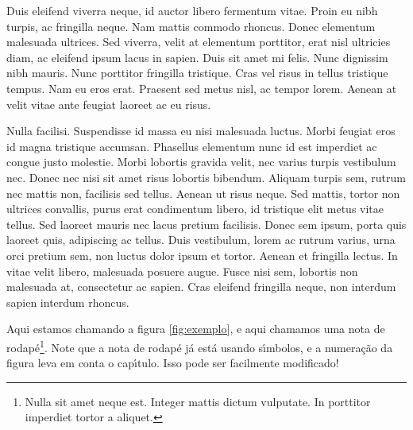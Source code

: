 Duis eleifend viverra neque, id auctor libero fermentum vitae. Proin eu nibh turpis, ac fringilla neque. Nam mattis commodo rhoncus. Donec elementum malesuada ultrices. Sed viverra, velit at elementum porttitor, erat nisl ultricies diam, ac eleifend ipsum lacus in sapien. Duis sit amet mi felis. Nunc dignissim nibh mauris. Nunc porttitor fringilla tristique. Cras vel risus in tellus tristique tempus. Nam eu eros erat. Praesent sed metus nisl, ac tempor lorem. Aenean at velit vitae ante feugiat laoreet ac eu risus.

Nulla facilisi. Suspendisse id massa eu nisi malesuada luctus. Morbi feugiat eros id magna tristique accumsan. Phasellus elementum nunc id est imperdiet ac congue justo molestie. Morbi lobortis gravida velit, nec varius turpis vestibulum nec. Donec nec nisi sit amet risus lobortis bibendum. Aliquam turpis sem, rutrum nec mattis non, facilisis sed tellus. Aenean ut risus neque. Sed mattis, tortor non ultrices convallis, purus erat condimentum libero, id tristique elit metus vitae tellus. Sed laoreet mauris nec lacus pretium facilisis. Donec sem ipsum, porta quis laoreet quis, adipiscing ac tellus. Duis vestibulum, lorem ac rutrum varius, urna orci pretium sem, non luctus dolor ipsum et tortor. Aenean et fringilla lectus. In vitae velit libero, malesuada posuere augue. Fusce nisi sem, lobortis non malesuada at, consectetur ac sapien. Cras eleifend fringilla neque, non interdum sapien interdum rhoncus.


Aqui estamos chamando a figura \ref{fig:exemplo}, e aqui chamamos uma nota de rodap\'e\footnote{Nulla sit amet neque est. Integer mattis dictum vulputate. In porttitor imperdiet tortor a aliquet.}. Note que a nota de rodap\'e j\'a est\'a usando s\'{\i}mbolos, e a numera\c{c}\~ao da figura leva em conta o cap\'{\i}tulo. Isso pode ser facilmente modificado!

